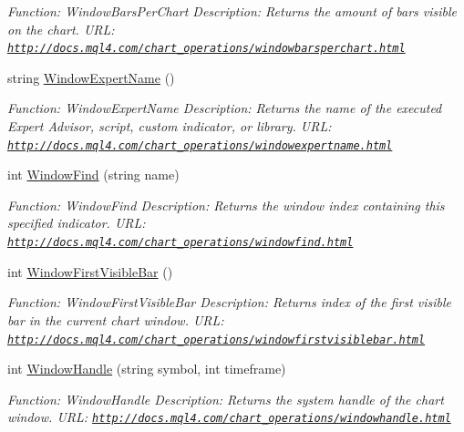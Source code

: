 \begin{DoxyCompactItemize}
\begin{DoxyCompactList}\small\item\em Function\+: Window\+Bars\+Per\+Chart Description\+: Returns the amount of bars visible on the chart. U\+RL\+: \href{http://docs.mql4.com/chart_operations/windowbarsperchart.html}{\tt http\+://docs.\+mql4.\+com/chart\+\_\+operations/windowbarsperchart.\+html} \end{DoxyCompactList}\item 
string \hyperlink{class_m_q_l4_c_sharp_1_1_base_1_1_m_q_l_base_ac9d1a306904d6fcff432271b5e5dfa34}{Window\+Expert\+Name} ()
\begin{DoxyCompactList}\small\item\em Function\+: Window\+Expert\+Name Description\+: Returns the name of the executed Expert Advisor, script, custom indicator, or library. U\+RL\+: \href{http://docs.mql4.com/chart_operations/windowexpertname.html}{\tt http\+://docs.\+mql4.\+com/chart\+\_\+operations/windowexpertname.\+html} \end{DoxyCompactList}\item 
int \hyperlink{class_m_q_l4_c_sharp_1_1_base_1_1_m_q_l_base_af3d70e6dc184efc783bfc3246c2eaf41}{Window\+Find} (string name)
\begin{DoxyCompactList}\small\item\em Function\+: Window\+Find Description\+: Returns the window index containing this specified indicator. U\+RL\+: \href{http://docs.mql4.com/chart_operations/windowfind.html}{\tt http\+://docs.\+mql4.\+com/chart\+\_\+operations/windowfind.\+html} \end{DoxyCompactList}\item 
int \hyperlink{class_m_q_l4_c_sharp_1_1_base_1_1_m_q_l_base_aeea7c8cb00b915bd973af70023f12599}{Window\+First\+Visible\+Bar} ()
\begin{DoxyCompactList}\small\item\em Function\+: Window\+First\+Visible\+Bar Description\+: Returns index of the first visible bar in the current chart window. U\+RL\+: \href{http://docs.mql4.com/chart_operations/windowfirstvisiblebar.html}{\tt http\+://docs.\+mql4.\+com/chart\+\_\+operations/windowfirstvisiblebar.\+html} \end{DoxyCompactList}\item 
int \hyperlink{class_m_q_l4_c_sharp_1_1_base_1_1_m_q_l_base_ad73ae87b25c66caa29c434ca956c9e30}{Window\+Handle} (string symbol, int timeframe)
\begin{DoxyCompactList}\small\item\em Function\+: Window\+Handle Description\+: Returns the system handle of the chart window. U\+RL\+: \href{http://docs.mql4.com/chart_operations/windowhandle.html}{\tt http\+://docs.\+mql4.\+com/chart\+\_\+operations/windowhandle.\+html} \end{DoxyCompactList}\item 

\end{DoxyCompactItemize}
